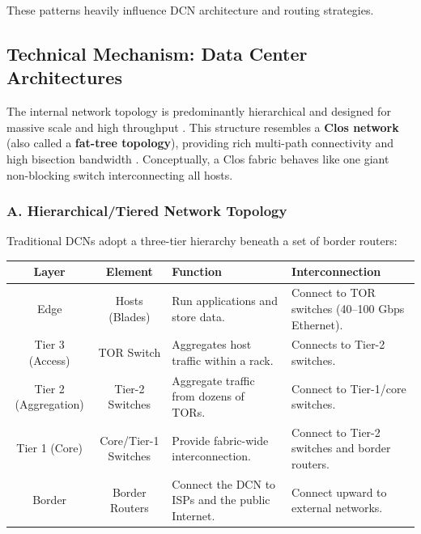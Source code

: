 \documentclass[12pt]{article}
\begin{document}
These patterns heavily influence DCN architecture and routing strategies.


\subsection{Technical Mechanism: Data Center Architectures}

The internal network topology is predominantly hierarchical and designed for massive scale and high throughput \cite{13778}. This structure resembles a \textbf{Clos network} (also called a \textbf{fat-tree topology}), providing rich multi-path connectivity and high bisection bandwidth \cite{13778,13779}. Conceptually, a Clos fabric behaves like one giant non-blocking switch interconnecting all hosts.

\subsubsection{A. Hierarchical/Tiered Network Topology}

Traditional DCNs adopt a three-tier hierarchy beneath a set of border routers:

\begin{center}
    \begin{tabular}{|c|c|p{5cm}|p{4.5cm}|}
        \hline
        \textbf{Layer}       & \textbf{Element}     & \textbf{Function}                                & \textbf{Interconnection}                         \\
        \hline
        Edge                 & Hosts (Blades)       & Run applications and store data.                 & Connect to TOR switches (40--100 Gbps Ethernet). \\
        \hline
        Tier 3 (Access)      & TOR Switch           & Aggregates host traffic within a rack.           & Connects to Tier-2 switches.                     \\
        \hline
        Tier 2 (Aggregation) & Tier-2 Switches      & Aggregate traffic from dozens of TORs.           & Connect to Tier-1/core switches.                 \\
        \hline
        Tier 1 (Core)        & Core/Tier-1 Switches & Provide fabric-wide interconnection.             & Connect to Tier-2 switches and border routers.   \\
        \hline
        Border               & Border Routers       & Connect the DCN to ISPs and the public Internet. & Connect upward to external networks.             \\
        \hline
    \end{tabular}
\end{center}
\end{document}
